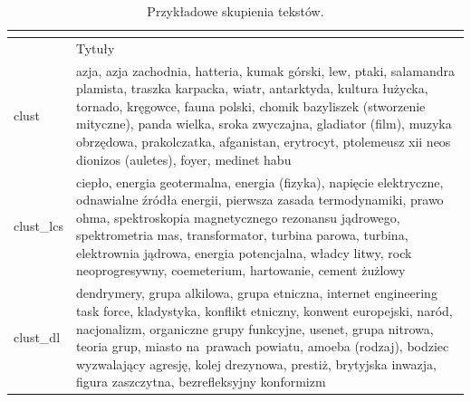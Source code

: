 \documentclass{praca1}
\begin{document}
{}
\begin{longtable}{|L{0.5cm}|L{15cm}|} %
\caption{Przykładowe skupienia tekstów.} 
\vspace*{-0.4cm}
\label{tab:007} \\
  \hline
  & Tytuły \\ %
  \hline
\begin{sideways}clust\end{sideways} & azja, azja zachodnia, hatteria, kumak górski, lew, ptaki, salamandra plamista, traszka karpacka, wiatr, antarktyda, kultura łużycka, tornado, kręgowce, fauna polski, chomik bazyliszek (stworzenie mityczne), panda wielka, sroka zwyczajna, gladiator (film), muzyka obrzędowa, prakolczatka, afganistan, erytrocyt, ptolemeusz xii neos dionizos (auletes), foyer, medinet habu \\ %
   \hline
\begin{sideways}clust\_lcs\end{sideways} & ciepło, energia geotermalna, energia (fizyka), napięcie elektryczne, odnawialne źródła energii, pierwsza zasada termodynamiki, prawo ohma, spektroskopia magnetycznego rezonansu jądrowego, spektrometria mas, transformator, turbina parowa, turbina, elektrownia jądrowa, energia potencjalna, władcy litwy, rock neoprogresywny, coemeterium, hartowanie, cement żużlowy \\ %
   \hline
\begin{sideways}clust\_dl\end{sideways} & dendrymery, grupa alkilowa, grupa etniczna, internet engineering task force, kladystyka, konflikt etniczny, konwent europejski, naród, nacjonalizm, organiczne grupy funkcyjne, usenet, grupa nitrowa, teoria grup, miasto na~prawach powiatu, amoeba (rodzaj), bodziec wyzwalający agresję, kolej drezynowa, prestiż, brytyjska inwazja, figura zaszczytna, bezrefleksyjny konformizm\\ %

\end{longtable}
\end{document}
